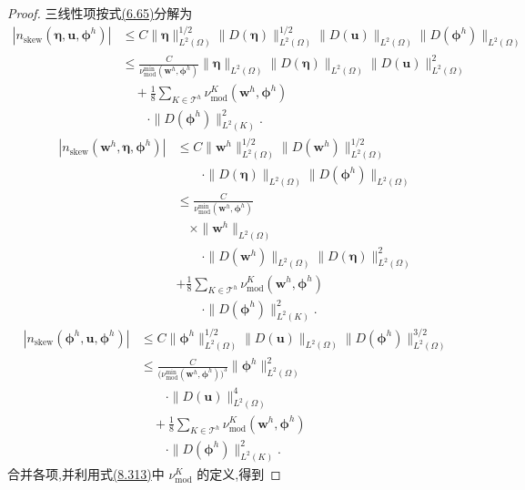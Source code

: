 \begin{proof}
三线性项按式\hyperref[eq:steady-ns-error-convection-splitting-alt]{(6.65)}分解为
\[
\begin{aligned}
 |n_{\mathrm{skew}}(\symbf{\eta},\bm u,\symbf{\phi}^h)|
 &\le C\|\symbf{\eta}\|_{L^2(\Omega)}^{1/2}
       \|D(\symbf{\eta})\|_{L^2(\Omega)}^{1/2}
       \|D(\bm u)\|_{L^2(\Omega)}
       \|D(\symbf{\phi}^h)\|_{L^2(\Omega)}\\
 &\le \frac{C}{\nu_{\mathrm{mod}}^{\min}(\bm w^h,\symbf{\phi}^h)}
       \|\symbf{\eta}\|_{L^2(\Omega)}
       \|D(\symbf{\eta})\|_{L^2(\Omega)}
       \|D(\bm u)\|_{L^2(\Omega)}^2\\
 &\quad+\frac18\sum_{K\in\mathcal T^h}
       \nu_{\mathrm{mod}}^K(\bm w^h,\symbf{\phi}^h)\\
 &\qquad\cdot\|D(\symbf{\phi}^h)\|_{L^2(K)}^2.
\end{aligned}
\]
\[
\begin{aligned}
 |n_{\mathrm{skew}}(\bm w^h,\symbf{\eta},\symbf{\phi}^h)|
 &\le C\|\bm w^h\|_{L^2(\Omega)}^{1/2}
       \|D(\bm w^h)\|_{L^2(\Omega)}^{1/2}\\
 &\qquad\cdot\|D(\symbf{\eta})\|_{L^2(\Omega)}
       \|D(\symbf{\phi}^h)\|_{L^2(\Omega)}\\
 &\le \frac{C}{\nu_{\mathrm{mod}}^{\min}(\bm w^h,\symbf{\phi}^h)}\\
 &\quad\times\|\bm w^h\|_{L^2(\Omega)}\\
 &\qquad\cdot\|D(\bm w^h)\|_{L^2(\Omega)}
       \|D(\symbf{\eta})\|_{L^2(\Omega)}^2\\
 &+\frac18\sum_{K\in\mathcal T^h}
       \nu_{\mathrm{mod}}^K(\bm w^h,\symbf{\phi}^h)\\
 &\qquad\cdot\|D(\symbf{\phi}^h)\|_{L^2(K)}^2.
\end{aligned}
\]
\[
\begin{aligned}
 |n_{\mathrm{skew}}(\symbf{\phi}^h,\bm u,\symbf{\phi}^h)|
 &\le C\|\symbf{\phi}^h\|_{L^2(\Omega)}^{1/2}
       \|D(\bm u)\|_{L^2(\Omega)}
       \|D(\symbf{\phi}^h)\|_{L^2(\Omega)}^{3/2}\\
 &\le \frac{C}{\bigl(\nu_{\mathrm{mod}}^{\min}
       (\bm w^h,\symbf{\phi}^h)\bigr)^3}
       \|\symbf{\phi}^h\|_{L^2(\Omega)}^2\\
 &\qquad\cdot\|D(\bm u)\|_{L^2(\Omega)}^4\\
 &\quad+\frac18\sum_{K\in\mathcal T^h}
       \nu_{\mathrm{mod}}^K(\bm w^h,\symbf{\phi}^h)\\
 &\qquad\cdot\|D(\symbf{\phi}^h)\|_{L^2(K)}^2.
\end{aligned}
\]
合并各项,并利用式\hyperref[eq:vms-coarse-projection-modified-viscosity]{(8.313)}中 $\nu_{\mathrm{mod}}^K$ 的定义,得到

\end{proof}
